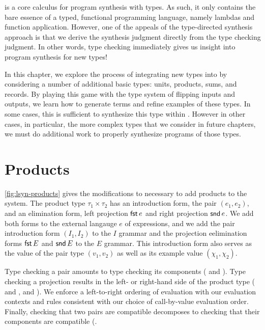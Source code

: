 \lsyn{} is a core calculus for program synthesis with types.
As such, it only contains the bare essence of a typed, functional programming language, namely lambdas and function application.
However, one of the appeals of the type-directed synthesis approach is that we derive the synthesis judgment directly from the type checking judgment.
In other words, type checking immediately gives us insight into program synthesis for new types!

In this chapter, we explore the process of integrating new types into \lsyn{} by considering a number of additional basic types: units, products, sums, and records.
By playing this game with the type system of flipping inputs and outputs, we learn how to generate terms and refine examples of these types.
In some cases, this is sufficient to synthesize this type within \lsyn{}.
However in other cases, in particular, the more complex types that we consider in future chapters, we must do additional work to properly synthesize programs of those types.

\section{Products}



\autoref{fig:lsyn-products} gives the modifications to \lsyn{} necessary to add products to the system.
The product type $τ_1 × τ_2$ has an introduction form, the pair $(e_1, e_2)$, and an elimination form, left projection $\mathsf{fst}\,e$ and right projection $\mathsf{snd}\,e$.
We add both forms to the external langauge $e$ of expressions, and we add the pair introduction form $(I_1, I_2)$ to the $I$ grammar and the projection eelimination forms $\mathsf{fst}\,E$ and $\mathsf{snd}\,E$ to the $E$ grammar.
This introduction form also serves as the value of the pair type $(v_1, v_2)$ as well as its example value $(χ_1, χ_2)$.

Type checking a pair amounts to type checking its components ( and ).
Type checking a projection results in the left- or right-hand side of the product type ( and ,  and ).
We enforce a left-to-right ordering of evaluation with our evaluation contexts and rules consistent with our choice of call-by-value evaluation order.
Finally, checking that two pairs are compatible decomposes to checking that their components are compatible (.

